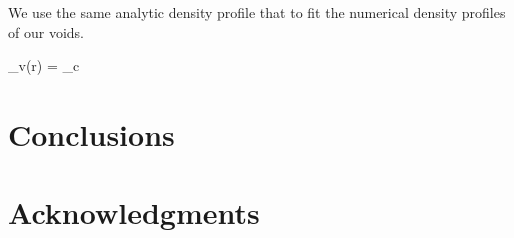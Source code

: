 \documentclass[a4,useAMS,usenatbib,usegraphicx]{latex/mn2e}
\begin{document}
We use the same analytic density profile that \SRKED{[Hamaous, et.al 2014]} 
to fit the numerical density profiles of our voids.


{
\delta_v(r) = \delta_c
}



\section{Conclusions}
\label{sec:conclusions}


\section*{Acknowledgments}  




\end{document}
